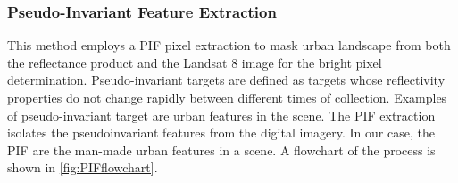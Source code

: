 \subsubsection{Pseudo-Invariant Feature Extraction}

This method employs a PIF pixel extraction \cite{Schott:1988} to mask urban landscape from both the reflectance product and the Landsat 8 image for the bright pixel determination. Pseudo-invariant targets are defined as targets whose reflectivity properties do not change rapidly between different times of collection. Examples of pseudo-invariant target are urban features in the scene.  The PIF extraction isolates the pseudoinvariant features from the digital imagery. In our case, the PIF are the man-made urban features in a scene. A flowchart of the process is shown in \autoref{fig:PIFflowchart}. 

